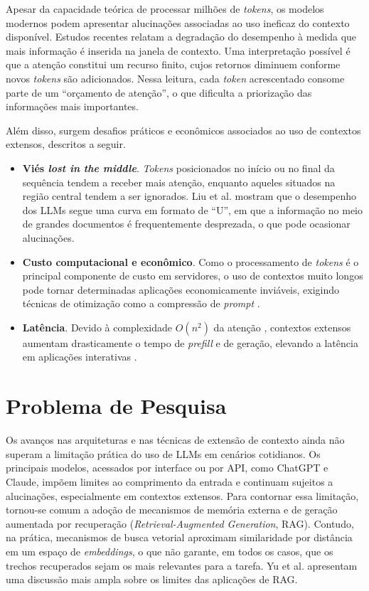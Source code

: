 Apesar da capacidade teórica de processar milhões de \textit{tokens}, os modelos modernos podem apresentar alucinações associadas ao uso ineficaz do contexto disponível. Estudos recentes \cite{chroma2024curse,chen2025criticalattention} relatam a degradação do desempenho à medida que mais informação é inserida na janela de contexto. Uma interpretação possível é que a atenção constitui um recurso finito, cujos retornos diminuem conforme novos \textit{tokens} são adicionados. Nessa leitura, cada \textit{token} acrescentado consome parte de um ``orçamento de atenção'', o que dificulta a priorização das informações mais importantes.

Além disso, surgem desafios práticos e econômicos associados ao uso de contextos extensos, descritos a seguir.

\begin{itemize}[leftmargin=1.6em]
\item \textbf{Viés \textit{lost in the middle}}. \textit{Tokens} posicionados no início ou no final da sequência tendem a receber mais atenção, enquanto aqueles situados na região central tendem a ser ignorados. Liu et al. \cite{liu2024lostmiddle} mostram que o desempenho dos LLMs segue uma curva em formato de ``U'', em que a informação no meio de grandes documentos é frequentemente desprezada, o que pode ocasionar alucinações.

\item \textbf{Custo computacional e econômico}. Como o processamento de \textit{tokens} é o principal componente de custo em servidores, o uso de contextos muito longos pode tornar determinadas aplicações economicamente inviáveis, exigindo técnicas de otimização como a compressão de \textit{prompt} \cite{jiang2023llmlingua}.

\item \textbf{Latência}. Devido à complexidade $O(n^2)$ da atenção \cite{vaswani2017attention}, contextos extensos aumentam drasticamente o tempo de \textit{prefill} e de geração, elevando a latência em aplicações interativas \cite{aman2024latency}.
\end{itemize}

\section{Problema de Pesquisa}
\label{sec:problema-pesquisa}

Os avanços nas arquiteturas e nas técnicas de extensão de contexto ainda não superam a limitação prática do uso de LLMs em cenários cotidianos. Os principais modelos, acessados por interface ou por API, como ChatGPT e Claude, impõem limites ao comprimento da entrada e continuam sujeitos a alucinações, especialmente em contextos extensos. Para contornar essa limitação, tornou-se comum a adoção de mecanismos de memória externa e de geração aumentada por recuperação (\textit{Retrieval-Augmented Generation}, RAG). Contudo, na prática, mecanismos de busca vetorial aproximam similaridade por distância em um espaço de \textit{embeddings}, o que não garante, em todos os casos, que os trechos recuperados sejam os mais relevantes para a tarefa. Yu et al. \cite{yu2024defenserag} apresentam uma discussão mais ampla sobre os limites das aplicações de RAG.


